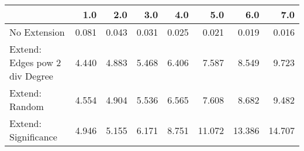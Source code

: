 \begin{tabular}{lrrrrrrr}
\toprule
{} &   1.0 &   2.0 &   3.0 &   4.0 &    5.0 &    6.0 &    7.0 \\
\midrule
No Extension                   & 0.081 & 0.043 & 0.031 & 0.025 &  0.021 &  0.019 &  0.016 \\
Extend: Edges pow 2 div Degree & 4.440 & 4.883 & 5.468 & 6.406 &  7.587 &  8.549 &  9.723 \\
Extend: Random                 & 4.554 & 4.904 & 5.536 & 6.565 &  7.608 &  8.682 &  9.482 \\
Extend: Significance           & 4.946 & 5.155 & 6.171 & 8.751 & 11.072 & 13.386 & 14.707 \\
\bottomrule
\end{tabular}
